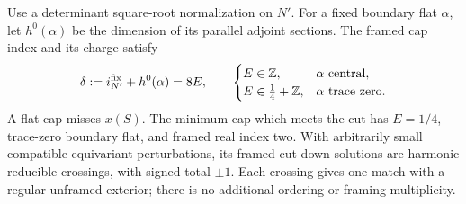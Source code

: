 \begin{lemma}\label{lem:negative:cap}
Use a determinant square-root normalization on $N'$.  For a fixed
boundary flat $\alpha$, let $h^0(\alpha)$ be the dimension of its parallel
adjoint sections.  The framed cap index and its charge satisfy
\begin{equation}\label{eq:negative:cap-index}
 \delta:=i_{N'}^{\mathrm{fix}}+h^0(\alpha)=8E,
 \qquad
 \begin{cases}
 E\in\mathbb Z,&\alpha\text{ central},\\
 E\in\frac14+\mathbb Z,&\alpha\text{ trace zero}.
 \end{cases}
\end{equation}
A flat cap misses $x(S)$.  The minimum cap which meets the cut has
$E=1/4$, trace-zero boundary flat, and framed real index two.  With
arbitrarily small compatible equivariant perturbations, its framed
cut-down solutions are harmonic reducible crossings, with signed total
$\pm1$.  Each crossing gives one match with a regular unframed exterior;
there is no additional ordering or framing multiplicity.
\end{lemma}

